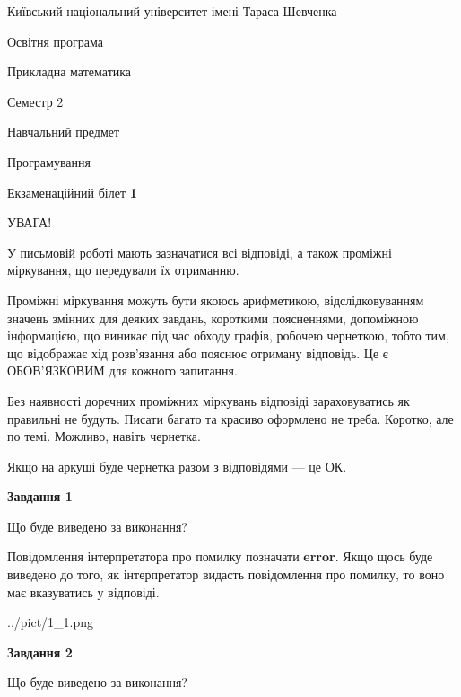 \documentclass[12pt, ukrainian]{article}
\begin{document}
{{\begin {small}\par
{ \center  Київський національний університет імені Тараса Шевченка \par}
{\parbox {5 cm}{Освітня програма \hfill}{\parbox {7 cm}{Прикладна математика \hfill}}\parbox {6 cm}{\hfill Семестр 2}}\par
{\parbox {5 cm} {Навчальний предмет \hfill}\parbox {7 cm}{Програмування \hfill}\parbox {6cm}{\hfill}\par}\vspace{-7pt} \end{small}}{\center Екзаменаційний білет \No \textbf
{ 1 }\par}}
{
\begin {large}
УВАГА!

У письмовій роботі мають зазначатися всі відповіді, а також проміжні міркування, що передували їх отриманню.

Проміжні міркування можуть бути якоюсь арифметикою, відслідковуванням зна\-чень змінних для деяких завдань,
короткими поясненнями, допоміжною інформацією, що виникає під час обходу графів, робочею чернеткою,
тобто тим, що відображає хід розв’язання або пояснює отриману відповідь.
Це є ОБОВ’ЯЗКОВИМ для кожного запитання.

Без наявності доречних проміжних міркувань відповіді зараховуватись як правиль\-ні не будуть.
Писати багато та красиво оформлено не треба. Коротко, але по темі. Можли\-во, навіть чернетка.

Якщо на аркуші буде чернетка разом з відповідями --- це ОК.

\newpage

{\begin {center}\textbf{Завдання 1}\end {center}}\par
Що буде виведено за виконання?

Повідомлення інтерпретатора про помилку позначати \textbf{error}.
Якщо щось буде виведено до того, як інтерпретатор видасть повідомлення про помилку, 
то воно має вказуватись у відповіді. \par


\begin{center}
	{../pict/1_1.png}
\end{center}
\newpage

{\begin {center}\textbf{Завдання 2}\end {center}}\par
Що буде виведено за виконання?


\end{large}}
\end{document}
